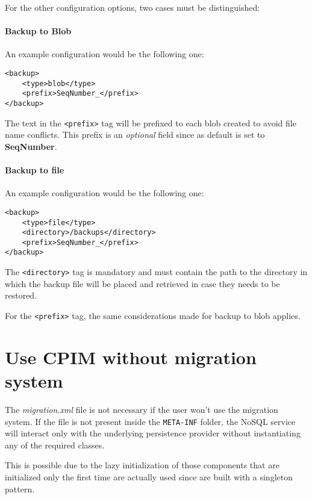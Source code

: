\newparagraph For the other configuration options, two cases must be distinguished:

\paragraph{Backup to Blob} An example configuration would be the following one:
\begin{verbatim}
<backup>
    <type>blob</type>
    <prefix>SeqNumber_</prefix>
</backup>
\end{verbatim}

\noindent The text in the \texttt{<prefix>} tag will be prefixed to each blob created to avoid file name conflicts.
This prefix is an \textit{optional} field since as default is set to \textbf{SeqNumber\textunderscore}.

\paragraph{Backup to file} An example configuration would be the following one:
\begin{verbatim}
<backup>
    <type>file</type>
    <directory>/backups</directory>
    <prefix>SeqNumber_</prefix>
</backup>
\end{verbatim}

\noindent The \texttt{<directory>} tag is mandatory and must contain the path to the directory in which the backup file will be placed and retrieved in case they needs to be restored.

\noindent For the \texttt{<prefix>} tag, the same considerations made for backup to blob applies.

\section{Use CPIM without migration system}
The \textit{migration.xml} file is not necessary if the user won't use the migration system. If the file is not present inside the \texttt{META-INF} folder, the NoSQL service will interact only with the underlying persistence provider without instantiating any of the required classes.

\noindent This is possible due to the lazy initialization of those components that are initialized only the first time are actually used since are built with a singleton pattern.